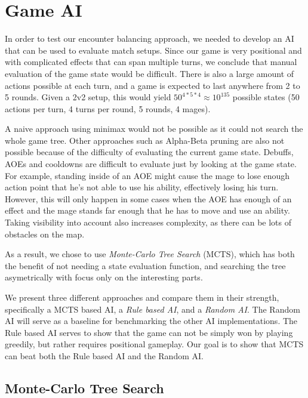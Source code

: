 \chapter{Game AI}
\label{chapter03}

In order to test our encounter balancing approach, we needed to develop an
AI that can be used to evaluate match setups. Since our game is very
positional and with complicated effects that can span multiple turns, we
conclude that manual evaluation of the game state would be difficult.
There is also a large amount of actions possible at each turn, and a game is expected
to last anywhere from 2 to 5 rounds. Given a 2v2 setup, this would yield
$50^{4*5*4} \approx 10^{135}$ possible states (50 actions per turn, 4 turns per round, 5 rounds, 4 mages).

A naive approach using minimax \citep{ai-modern} would not be possible as it could not search the whole game tree. Other approaches such as Alpha-Beta pruning \citep{ai-modern} are also not possible because of the difficulty of evaluating the current game state. Debuffs, AOEs and cooldowns are difficult to evaluate just by looking at the game state. For example, standing inside of an AOE might cause the mage to lose enough action point that he's not able to use his ability, effectively losing his turn. However, this will only happen in some cases when the AOE has enough of an effect and the mage stands far enough that he has to move and use an ability. Taking visibility into account also increases complexity, as there can be lots of obstacles on the map.

As a result, we chose to use \emph{Monte-Carlo Tree Search} (MCTS), which has both the benefit of not needing a state evaluation function, and searching the tree asymetrically with focus only on the interesting parts.

We present three different approaches and compare them in their strength,
specifically a MCTS based AI, a \emph{Rule based AI}, and a \emph{Random AI}. The Random AI will serve
as a baseline for benchmarking the other AI implementations. The Rule based AI serves to show that the game
can not be simply won by playing greedily, but rather requires positional gameplay. Our goal is to show
that MCTS can beat both the Rule based AI and the Random AI.

\section{Monte-Carlo Tree Search}

